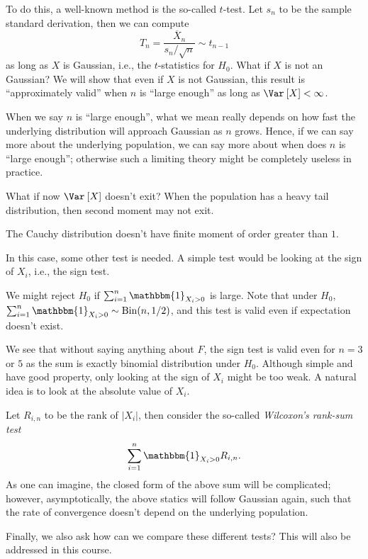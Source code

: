 To do this, a well-known method is the so-called \(t\)-test. Let \(s_n\) to be the sample standard derivation, then we can compute
\[
	T_n = \frac{\overline{X} _n}{s_n / \sqrt{n} } \sim t_{n-1}
\]
as long as \(X\) is Gaussian, i.e., the \(t\)-statistics for \(H_0\). What if \(X\) is not an Gaussian? We will show that even if \(X\) is not Gaussian, this result is ``approximately valid'' when \(n\) is ``large enough'' as long as \(\Var_{}\left[X \right] < \infty \).

\begin{remark}
	When we say \(n\) is ``large enough'', what we mean really depends on how fast the underlying distribution will approach Gaussian as \(n\) grows. Hence, if we can say more about the underlying population, we can say more about when does \(n\) is ``large enough''; otherwise such a limiting theory might be completely useless in practice.
\end{remark}

What if now \(\Var_{}\left[X \right] \) doesn't exit? When the population has a heavy tail distribution, then second moment may not exit.

\begin{eg}
	The Cauchy distribution doesn't have finite moment of order greater than \(1\).
\end{eg}

In this case, some other test is needed. A simple test would be looking at the sign of \(X_i\), i.e., the sign test.

\begin{eg}
	We might reject \(H_0\) if \(\sum_{i=1}^{n} \mathbbm{1}_{X_i > 0} \) is large. Note that under \(H_0\), \(\sum_{i=1}^{n} \mathbbm{1}_{X_i > 0} \sim \operatorname{Bin}(n, 1/2) \), and this test is valid even if expectation doesn't exist.
\end{eg}

We see that without saying anything about \(F\), the sign test is valid even for \(n = 3\) or \(5\) as the sum is exactly binomial distribution under \(H_0\). Although simple and have good property, only looking at the sign of \(X_i\) might be too weak. A natural idea is to look at the absolute value of \(X_i\).

\begin{eg}
	Let \(R_{i, n} \) to be the rank of \(\vert X_i \vert \), then consider the so-called \emph{Wilcoxon's rank-sum test}
	\[
		\sum_{i=1}^{n} \mathbbm{1}_{X_i > 0} R_{i, n}.
	\]
	As one can imagine, the closed form of the above sum will be complicated; however, asymptotically, the above statics will follow Gaussian again, such that the rate of convergence doesn't depend on the underlying population.
\end{eg}

Finally, we also ask how can we compare these different tests? This will also be addressed in this course.